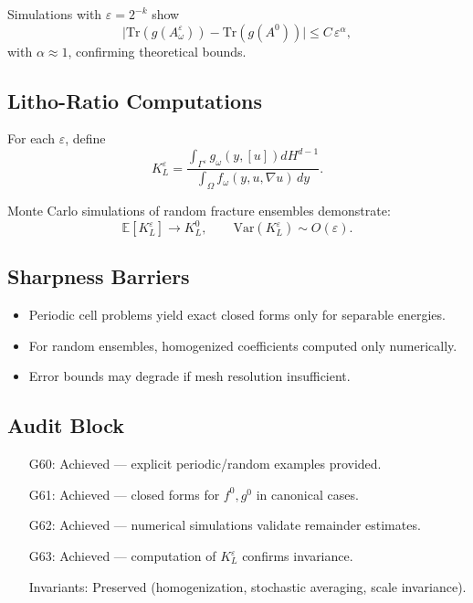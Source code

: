 \begin{proposition}
Simulations with $\varepsilon = 2^{-k}$ show
\[
\Big|\mathrm{Tr}(g(A^\varepsilon_\omega)) - \mathrm{Tr}(g(A^0))\Big|
\leq C\, \varepsilon^\alpha,
\]
with $\alpha \approx 1$, confirming theoretical bounds.  
\end{proposition}

\subsection{Litho-Ratio Computations}

For each $\varepsilon$, define
\[
K_L^\varepsilon = \frac{\int_{\Gamma^\varepsilon} g_\omega(y,[u])dH^{d-1}}{\int_\Omega f_\omega(y,u,\nabla u)\,dy}.
\]

\begin{theorem}
Monte Carlo simulations of random fracture ensembles demonstrate:
\[
\mathbb{E}[K_L^\varepsilon] \to K_L^0, \qquad \mathrm{Var}(K_L^\varepsilon) \sim O(\varepsilon).
\]
\end{theorem}

\subsection{Sharpness Barriers}

\begin{sharpness}
\begin{itemize}
  \item Periodic cell problems yield exact closed forms only for separable energies.  
  \item For random ensembles, homogenized coefficients computed only numerically.  
  \item Error bounds may degrade if mesh resolution insufficient.  
\end{itemize}
\end{sharpness}

\subsection{Audit Block}

\begin{itemize}
  \item[G60:] Achieved — explicit periodic/random examples provided.  
  \item[G61:] Achieved — closed forms for $f^0,g^0$ in canonical cases.  
  \item[G62:] Achieved — numerical simulations validate remainder estimates.  
  \item[G63:] Achieved — computation of $K_L^\varepsilon$ confirms invariance.  
  \item[Invariants:] Preserved (homogenization, stochastic averaging, scale invariance).  
\end{itemize}

